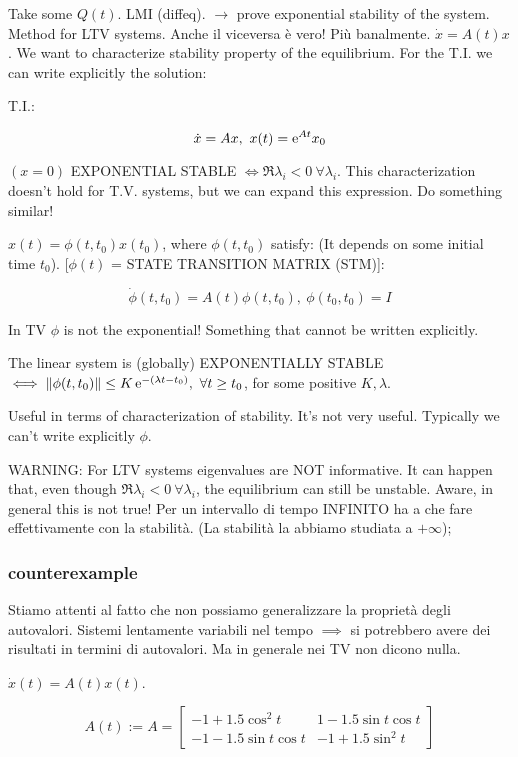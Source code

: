 Take some $Q(t)$. LMI (diffeq). $\rightarrow$ prove exponential stability of the system. Method for LTV systems. Anche il viceversa è vero! Più banalmente.
$\dot{x}=A(t)x$. We want to characterize stability property of the equilibrium. For the T.I. we can write explicitly the solution:

T.I.:

\[
	\dot{x}=Ax,\ x(t) = \mathop{}\!\mathrm{e}^{At}x_0
\]

$(x=0)$ EXPONENTIAL STABLE $\iff \Re{\lambda_i} < 0\ \forall \lambda_i$.
This characterization doesn't hold for T.V. systems, but we can expand this expression. Do something similar!

$x(t) = \phi(t,t_0)x(t_0)$, where $\phi(t,t_0)$ satisfy: (It depends on some initial time $t_0$). [$\phi(t)$ = STATE TRANSITION MATRIX (STM)]:

\[
	\dot{\phi}(t,t_0) = A(t)\phi(t,t_0),\ \phi(t_0,t_0)=I
\]

In TV $\phi$ is not the exponential! Something that cannot be written explicitly.

\begin{thrm}
The linear system is (globally) EXPONENTIALLY STABLE $\iff \lVert\phi(t,t_0)\rVert \leq K\mathop{}\!\mathrm{e}^{-(\lambda t-t_0)},\ \forall t \geq t_0$, for some positive $K,\lambda$.

\end{thrm}

Useful in terms of characterization of stability. It's not very useful. Typically we can't write explicitly $\phi$.

WARNING: For LTV systems eigenvalues are NOT informative. It can happen that, even though $\Re{\lambda_i} < 0\ \forall \lambda_i$, the equilibrium can still be unstable. Aware, in general this is not true!
Per un intervallo di tempo INFINITO ha a che fare effettivamente con la stabilità. (La stabilità la abbiamo studiata a $+\infty$);

\subsubsection{counterexample}

Stiamo attenti al fatto che non possiamo generalizzare la proprietà degli autovalori. Sistemi lentamente variabili nel tempo $\implies$ si potrebbero avere dei risultati in termini di autovalori. Ma in generale nei TV non dicono nulla.

$\dot{x}(t) = A(t)x(t)$.

\[
	A(t) := A = \begin{bmatrix}
	-1+1.5\cos^2{t} & 1-1.5\sin{t}\cos{t} \\
	-1-1.5\sin{t}\cos{t} & -1+1.5\sin^2{t} \end{bmatrix}
\]

